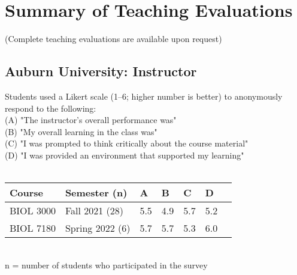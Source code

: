 \documentclass[11pt,a4paper,sans]{moderncv}        %
\begin{document}
\section{Summary of Teaching Evaluations}
{\footnotesize{(Complete teaching evaluations are available upon request)}}
\subsection{Auburn University: Instructor}
{Students used a Likert scale (1–6; higher number is better) to anonymously respond to the following:\\ (A) "The instructor's overall performance was"\\(B) "My overall learning in the class was"\\(C) "I was prompted to think critically about the course material"\\(D) "I was provided an environment that supported my learning"}\\ \\
\begin{tabular}{ p{3cm}p{3cm}p{1.5cm}p{1.5cm}p{1.5cm}p{1.5cm}p{1.5cm}  }
 \hline
Course & Semester (n) & A & B & C & D \\
 \hline
 BIOL 3000 & Fall 2021 (28) & 5.5 & 4.9 & 5.7 & 5.2  \\
 BIOL 7180 & Spring 2022 (6) & 5.7 & 5.7 & 5.3 & 6.0 \\ 
 \hline
\end{tabular} \\
{\tiny{n = number of students who participated in the survey}} \par
\end{document}
